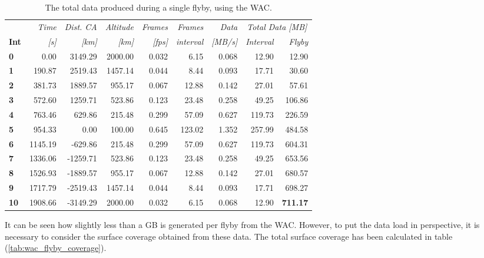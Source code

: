 \begin{table}[h!]
  \centering
    \begin{tabular}{l|r|r|r|r|r|r|r|r|}
      & \textit{Time} & \textit{Dist. CA} & \textit{Altitude} & \multicolumn{1}{c|}{\textit{Frames}} & \textit{Frames} & \textit{Data} & \multicolumn{2}{c}{\textit{Total Data [MB]}} \\
\textbf{Int} & \textit{[s]} & \textit{[km]} & \textit{[km]} & \textit{[fps]} & \textit{interval} & \textit{[MB/s]} & \textit{Interval} & \multicolumn{1}{r}{\textit{Flyby}} \bigstrut[b]\\
\hline
\textbf{0} & 0.00  & 3149.29 & 2000.00 & 0.032 & 6.15  & 0.068 & 12.90 & 12.90 \bigstrut[t]\\
\textbf{1} & 190.87 & 2519.43 & 1457.14 & 0.044 & 8.44  & 0.093 & 17.71 & 30.60 \\
\textbf{2} & 381.73 & 1889.57 & 955.17 & 0.067 & 12.88 & 0.142 & 27.01 & 57.61 \\
\textbf{3} & 572.60 & 1259.71 & 523.86 & 0.123 & 23.48 & 0.258 & 49.25 & 106.86 \\
\textbf{4} & 763.46 & 629.86 & 215.48 & 0.299 & 57.09 & 0.627 & 119.73 & 226.59 \\
\textbf{5} & 954.33 & 0.00  & 100.00 & 0.645 & 123.02 & 1.352 & 257.99 & 484.58 \\
\textbf{6} & 1145.19 & -629.86 & 215.48 & 0.299 & 57.09 & 0.627 & 119.73 & 604.31 \\
\textbf{7} & 1336.06 & -1259.71 & 523.86 & 0.123 & 23.48 & 0.258 & 49.25 & 653.56 \\
\textbf{8} & 1526.93 & -1889.57 & 955.17 & 0.067 & 12.88 & 0.142 & 27.01 & 680.57 \\
\textbf{9} & 1717.79 & -2519.43 & 1457.14 & 0.044 & 8.44  & 0.093 & 17.71 & 698.27 \\
\textbf{10} & 1908.66 & -3149.29 & 2000.00 & 0.032 & 6.15  & 0.068 & 12.90 & \textbf{711.17} \\
\end{tabular}%
      \caption{The total data produced during a single flyby, using the WAC.}
  \label{tab:wac_flyby_data}%
\end{table}%
It can be seen how slightly less than a GB is generated per flyby from the WAC. However, to put the data load in perspective, it is necessary to consider the surface coverage obtained from these data. The total surface coverage has been calculated in table (\ref{tab:wac_flyby_coverage}).
